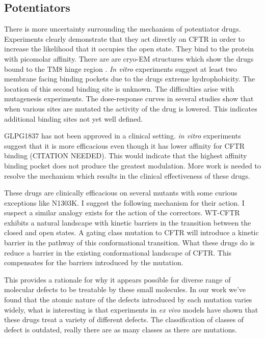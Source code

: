 \subsection{Potentiators}
There is more uncertainty surrounding the mechanism of potentiator drugs. Experiments clearly demonstrate that they act directly on CFTR in order to increase the likelihood that it occupies the open state. They bind to the protein with picomolar affinity. There are are cryo-EM structures which show the drugs bound to the TM8 hinge region \cite{}. \textit {In vitro} experiments suggest at least two membrane facing binding pockets due to the drugs extreme hydrophobicity\cite{}. The location of this second binding site is unknown. The difficulties arise with mutagenesis experiments. The dose-response curves in several studies show that when various sites are mutated the activity of the drug is lowered. This indicates additional binding sites not yet well defined. 

GLPG1837 has not been approved in a clinical setting. \textit {in vitro} experiments suggest that it is more efficacious even though it has lower affinity for CFTR binding (CITATION NEEDED). This would indicate that the highest affinity binding pocket does not produce the greatest modulation. More work is needed to resolve the mechanism which results in the clinical effectiveness of these drugs.  

These drugs are clinically efficacious \cite{VanGoor2014} on several mutants with some curious exceptions like N1303K. I suggest the following mechanism for their action. I suspect a similar analogy exists for the action of the correctors. WT-CFTR exhibits a natural landscape with kinetic barriers in the transition between the closed and open states. A gating class mutation to CFTR will introduce a kinetic barrier in the pathway of this conformational transition. What these drugs do is reduce a barrier in the existing conformational landscape of CFTR. This compensates for the barriers introduced by the mutation. 

This provides a rationale for why it appears possible for diverse range of molecular defects to be treatable by these small molecules. In our work we've found that the atomic nature of the defects introduced by each mutation varies widely, what is interesting is that experiments in \textit{ex vivo} models have shown that these drugs treat a variety of different defects. The classification of classes of defect is outdated, really there are as many classes as there are mutations.


